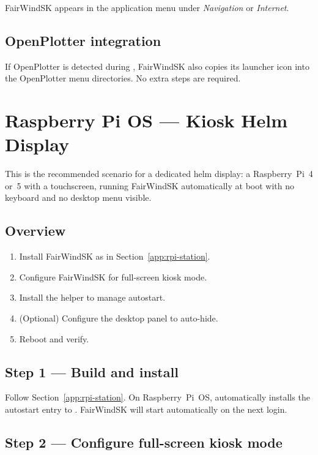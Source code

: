 FairWindSK appears in the application menu under
\textit{Navigation} or \textit{Internet}.

\subsection{OpenPlotter integration}

If OpenPlotter is detected during , FairWindSK
also copies its launcher icon into the OpenPlotter menu directories.
No extra steps are required.

\section{Raspberry Pi OS --- Kiosk Helm Display}
\label{app:rpi-kiosk}

This is the recommended scenario for a dedicated helm display:
a Raspberry~Pi~4 or~5 with a touchscreen, running FairWindSK automatically
at boot with no keyboard and no desktop menu visible.

\subsection{Overview}

\begin{enumerate}
  \item Install FairWindSK as in Section~\ref{app:rpi-station}.
  \item Configure FairWindSK for full-screen kiosk mode.
  \item Install the  helper to manage autostart.
  \item (Optional) Configure the desktop panel to auto-hide.
  \item Reboot and verify.
\end{enumerate}

\subsection{Step 1 --- Build and install}

Follow Section~\ref{app:rpi-station}.
On Raspberry~Pi~OS,  automatically installs the
 autostart entry to
.
FairWindSK will start automatically on the next login.

\subsection{Step 2 --- Configure full-screen kiosk mode}

